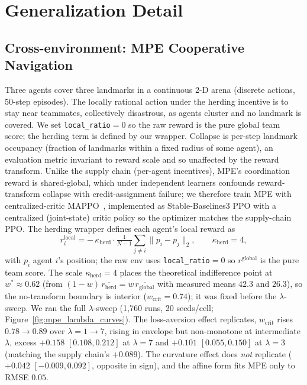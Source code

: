 \documentclass[letterpaper]{article} %
\theoremstyle{plain}
\newcommand{\wcrit}{w_{\mathrm{crit}}}
\begin{document}
\section{Generalization Detail}
\label{sec:s_generalization}

\subsection{Cross-environment: MPE Cooperative Navigation}
Three agents cover three landmarks in a continuous 2-D arena (discrete actions, 50-step
episodes). The locally rational action under the herding incentive is to stay near
teammates, collectively disastrous, as agents cluster and no landmark is covered. We set
\texttt{local\_ratio}${=}0$ so the raw reward is the pure global team score; the herding term
is defined by our wrapper. Collapse is per-step landmark occupancy (fraction of landmarks
within a fixed radius of some agent), an evaluation metric invariant to reward scale and so
unaffected by the reward transform. Unlike the supply chain (per-agent incentives), MPE's
coordination reward is shared-global, which under independent learners confounds reward-transform
collapse with credit-assignment failure; we therefore train MPE with centralized-critic
MAPPO~\citep{yu2022surprising,lowe2017multi}, implemented as Stable-Baselines3 PPO with a
centralized (joint-state) critic policy so the optimizer matches the supply-chain PPO. The herding
wrapper defines each agent's local reward as
\begin{equation}
r_i^{\mathrm{local}}=-\,\kappa_{\mathrm{herd}}\cdot
\tfrac{1}{N-1}\sum_{j\ne i}\lVert p_i-p_j\rVert_2,\qquad \kappa_{\mathrm{herd}}=4,
\end{equation}
with $p_i$ agent $i$'s position; the raw env uses \texttt{local\_ratio}${=}0$ so $r^{\mathrm{global}}$
is the pure team score. The scale $\kappa_{\mathrm{herd}}{=}4$ places the theoretical indifference
point at $w^\ast\approx0.62$ (from $(1{-}w)\,\overline{r_{\mathrm{herd}}}=w\,\overline{r_{\mathrm{global}}}$
with measured means $42.3$ and $26.3$), so the no-transform boundary is interior ($\wcrit{=}0.74$);
it was fixed before the $\lambda$-sweep. We ran the full $\lambda$-sweep (1{,}760 runs, 20 seeds/cell;
Figure~\ref{fig:mpe_lambda_curves}). The loss-aversion effect replicates, $\wcrit$ rises
$0.78\to0.89$ over $\lambda{=}1\to7$, rising in envelope but non-monotone at intermediate
$\lambda$, excess $+0.158$ $[0.108,0.212]$ at $\lambda{=}7$ and $+0.101$ $[0.055,0.150]$ at
$\lambda{=}3$ (matching the supply chain's $+0.089$). The curvature effect does \emph{not}
replicate ($+0.042$ $[-0.009,0.092]$, opposite in sign), and the affine form fits MPE only to
RMSE $0.05$.
\end{document}
